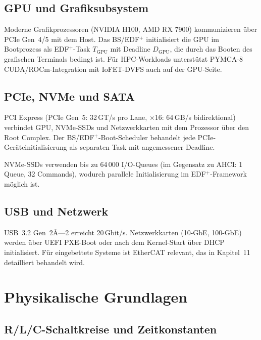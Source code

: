 ﻿\documentclass[a4paper,12pt]{scrreprt}
\theoremstyle{definition}
\begin{document}
	\section{GPU und Grafiksubsystem}
	
	Moderne Grafikprozessoren (NVIDIA H100, AMD RX 7900) kommunizieren über
	PCIe Gen~4/5 mit dem Host. Das BS/EDF$^+$ initialisiert die GPU im
	Bootprozess als EDF$^+$-Task $T_{\text{GPU}}$ mit Deadline $D_{\text{GPU}}$,
	die durch das Booten des grafischen Terminals bedingt ist.
	Für HPC-Workloads unterstützt PYMCA-8 \cite{Epp2026pymca8} CUDA/ROCm-Integration
	mit IoFET-DVFS auch auf der GPU-Seite.
	
	\section{PCIe, NVMe und SATA}
	
	PCI Express (PCIe Gen~5: 32\,GT/s pro Lane, $\times$16: 64\,GB/s bidirektional)
	verbindet GPU, NVMe-SSDs und Netzwerkkarten mit dem Prozessor über den
	Root Complex. Der BS/EDF$^+$-Boot-Scheduler behandelt jede PCIe-Geräteinitiali\-sierung
	als separaten Task mit angemessener Deadline.
	
	NVMe-SSDs verwenden bis zu 64\,000 I/O-Queues (im Gegensatz zu AHCI: 1 Queue,
	32 Commands), wodurch parallele Initialisierung im EDF$^+$-Framework möglich ist.
	
	\section{USB und Netzwerk}
	
	USB~3.2 Gen~2Ã—2 erreicht 20\,Gbit/s. Netzwerkkarten (10-GbE, 100-GbE) werden
	über UEFI PXE-Boot oder nach dem Kernel-Start über DHCP initialisiert.
	Für eingebettete Systeme ist EtherCAT \cite{IEC61158} relevant, das in
	Kapitel~11 detailliert behandelt wird.
	
	\chapter{Physikalische Grundlagen}
	
	\section{R/L/C-Schaltkreise und Zeitkonstanten}
\end{document}
